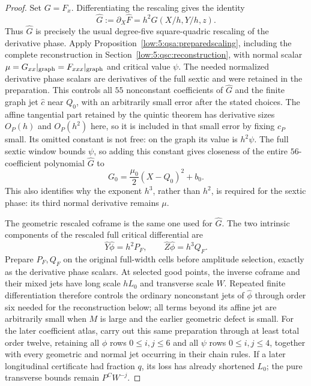 \documentclass[11pt]{amsart}
\theoremstyle{definition}
\theoremstyle{remark}
\numberwithin{equation}{section}
\begin{document}
\begin{proof}
Set $G=F_x$. Differentiating the rescaling gives the identity
\[
\widehat G:=\partial_X\widehat F=h^2G(X/h,Y/h,z).
\]
Thus $\widehat G$ is precisely the usual degree-five square-quadric rescaling of the derivative phase. Apply Proposition~\ref{low:5:qsa:preparedscaling}, including the complete reconstruction in Section~\ref{low:5:qsc:reconstruction}, with normal scalar $\mu=G_{xx}|_{\rm graph}=F_{xxx}|_{\rm graph}$ and critical value $\psi$. The needed normalized derivative phase scalars are derivatives of the full sextic and were retained in the preparation. This controls all $55$ nonconstant coefficients of $\widehat G$ and the finite graph jet $\widehat c$ near $Q_0$, with an arbitrarily small error after the stated choices. The affine tangential part retained by the quintic theorem has derivative sizes $O_P(h)$ and $O_P(h^2)$ here, so it is included in that small error by fixing $c_P$ small. Its omitted constant is not free: on the graph its value is $h^2\psi$. The full sextic window bounds $\psi$, so adding this constant gives closeness of the entire $56$-coefficient polynomial $\widehat G$ to
\[
G_0=\frac{\mu_0}{2}(X-Q_0)^2+b_0.
\]
This also identifies why the exponent $h^3$, rather than $h^2$, is required for the sextic phase: its third normal derivative remains $\mu$.

The geometric rescaled coframe is the same one used for $\widehat G$. The two intrinsic components of the rescaled full critical differential are
\[
\widehat Y\widehat\phi=h^2P_F,\qquad \widehat Z\widehat\phi=h^3Q_F.
\]
Prepare $P_F,Q_F$ on the original full-width cells before amplitude selection, exactly as the derivative phase scalars. At selected good points, the inverse coframe and their mixed jets have long scale $hL_0$ and transverse scale $W$. Repeated finite differentiation therefore controls the ordinary nonconstant jets of $\widehat\phi$ through order six needed for the reconstruction below; all terms beyond its affine jet are arbitrarily small when $M$ is large and the earlier geometric defect is small. For the later coefficient atlas, carry out this same preparation through at least total order twelve, retaining all $\phi$ rows $0\le i,j\le6$ and all $\psi$ rows $0\le i,j\le4$, together with every geometric and normal jet occurring in their chain rules. If a later longitudinal certificate had fraction $q$, its loss has already shortened $L_0$; the pure transverse bounds remain $P^CW^{-j}$. 


\end{proof}
\end{document}
